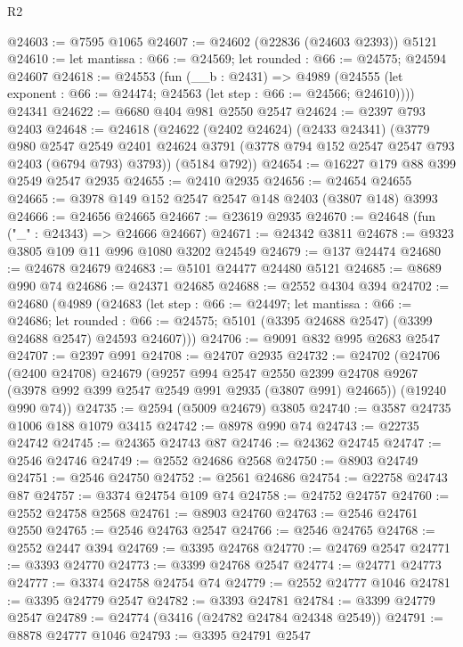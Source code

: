 \begin{lexlean}{R2}
\begin{coremodule}
@24603 := @7595 @1065
@24607 := @24602 (@22836 (@24603 @2393)) @5121
@24610 := let mantissa : @66 := @24569; let rounded : @66 := @24575; @24594 @24607
@24618 := @24553
    (fun (__b : @2431) =>
    @4989 (@24555 (let exponent : @66 := @24474; @24563 (let step : @66 := @24566; @24610))))
    @24341
@24622 := @6680 @404 @981 @2550 @2547
@24624 := @2397 @793 @2403
@24648 := @24618
    (@24622
      (@2402 @24624)
      (@2433 @24341)
      (@3779
        @980
        @2547
        @2549
        @2401
        @24624
        @3791
        (@3778 @794 @152 @2547 @2547 @793 @2403 (@6794 @793) @3793))
      (@5184 @792))
@24654 := @16227 @179 @88 @399 @2549 @2547 @2935
@24655 := @2410 @2935
@24656 := @24654 @24655
@24665 := @3978 @149 @152 @2547 @2547 @148 @2403 (@3807 @148) @3993
@24666 := @24656 @24665
@24667 := @23619 @2935
@24670 := @24648 (fun ("_" : @24343) => @24666 @24667)
@24671 := @24342 @3811
@24678 := @9323 @3805 @109 @11 @996 @1080 @3202 @24549
@24679 := @137 @24474
@24680 := @24678 @24679
@24683 := @5101 @24477 @24480 @5121
@24685 := @8689 @990 @74
@24686 := @24371 @24685
@24688 := @2552 @4304 @394
@24702 := @24680
    (@4989
      (@24683
        (let step : @66 := @24497;
        let mantissa : @66 := @24686;
        let rounded : @66 := @24575;
        @5101 (@3395 @24688 @2547) (@3399 @24688 @2547) @24593 @24607)))
@24706 := @9091 @832 @995 @2683 @2547
@24707 := @2397 @991
@24708 := @24707 @2935
@24732 := @24702
    (@24706
      (@2400 @24708)
      @24679
      (@9257
        @994
        @2547
        @2550
        @2399
        @24708
        @9267
        (@3978 @992 @399 @2547 @2549 @991 @2935 (@3807 @991) @24665))
      (@19240 @990 @74))
@24735 := @2594 (@5009 @24679) @3805
@24740 := @3587 @24735 @1006 @188 @1079 @3415
@24742 := @8978 @990 @74
@24743 := @22735 @24742
@24745 := @24365 @24743 @87
@24746 := @24362 @24745
@24747 := @2546 @24746
@24749 := @2552 @24686 @2568
@24750 := @8903 @24749
@24751 := @2546 @24750
@24752 := @2561 @24686
@24754 := @22758 @24743 @87
@24757 := @3374 @24754 @109 @74
@24758 := @24752 @24757
@24760 := @2552 @24758 @2568
@24761 := @8903 @24760
@24763 := @2546 @24761 @2550
@24765 := @2546 @24763 @2547
@24766 := @2546 @24765
@24768 := @2552 @2447 @394
@24769 := @3395 @24768
@24770 := @24769 @2547
@24771 := @3393 @24770
@24773 := @3399 @24768 @2547
@24774 := @24771 @24773
@24777 := @3374 @24758 @24754 @74
@24779 := @2552 @24777 @1046
@24781 := @3395 @24779 @2547
@24782 := @3393 @24781
@24784 := @3399 @24779 @2547
@24789 := @24774 (@3416 (@24782 @24784 @24348 @2549))
@24791 := @8878 @24777 @1046
@24793 := @3395 @24791 @2547

\end{coremodule}
\end{lexlean}
